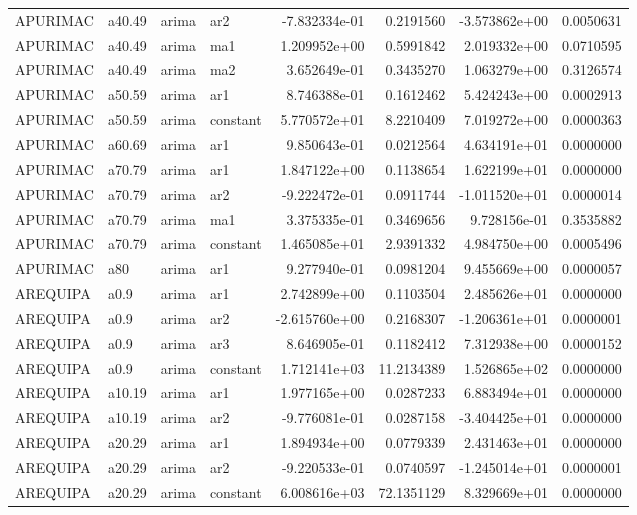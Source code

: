 \documentclass[
]{article}
\begin{document}
\begin{table}[!h]
\begin{tabular}[t]{llllrrrr}
APURIMAC & a40.49 & arima & ar2 & -7.832334e-01 & 0.2191560 & -3.573862e+00 & 0.0050631\\
APURIMAC & a40.49 & arima & ma1 & 1.209952e+00 & 0.5991842 & 2.019332e+00 & 0.0710595\\
\addlinespace
APURIMAC & a40.49 & arima & ma2 & 3.652649e-01 & 0.3435270 & 1.063279e+00 & 0.3126574\\
APURIMAC & a50.59 & arima & ar1 & 8.746388e-01 & 0.1612462 & 5.424243e+00 & 0.0002913\\
APURIMAC & a50.59 & arima & constant & 5.770572e+01 & 8.2210409 & 7.019272e+00 & 0.0000363\\
APURIMAC & a60.69 & arima & ar1 & 9.850643e-01 & 0.0212564 & 4.634191e+01 & 0.0000000\\
APURIMAC & a70.79 & arima & ar1 & 1.847122e+00 & 0.1138654 & 1.622199e+01 & 0.0000000\\
\addlinespace
APURIMAC & a70.79 & arima & ar2 & -9.222472e-01 & 0.0911744 & -1.011520e+01 & 0.0000014\\
APURIMAC & a70.79 & arima & ma1 & 3.375335e-01 & 0.3469656 & 9.728156e-01 & 0.3535882\\
APURIMAC & a70.79 & arima & constant & 1.465085e+01 & 2.9391332 & 4.984750e+00 & 0.0005496\\
APURIMAC & a80 & arima & ar1 & 9.277940e-01 & 0.0981204 & 9.455669e+00 & 0.0000057\\
AREQUIPA & a0.9 & arima & ar1 & 2.742899e+00 & 0.1103504 & 2.485626e+01 & 0.0000000\\
\addlinespace
AREQUIPA & a0.9 & arima & ar2 & -2.615760e+00 & 0.2168307 & -1.206361e+01 & 0.0000001\\
AREQUIPA & a0.9 & arima & ar3 & 8.646905e-01 & 0.1182412 & 7.312938e+00 & 0.0000152\\
AREQUIPA & a0.9 & arima & constant & 1.712141e+03 & 11.2134389 & 1.526865e+02 & 0.0000000\\
AREQUIPA & a10.19 & arima & ar1 & 1.977165e+00 & 0.0287233 & 6.883494e+01 & 0.0000000\\
AREQUIPA & a10.19 & arima & ar2 & -9.776081e-01 & 0.0287158 & -3.404425e+01 & 0.0000000\\
\addlinespace
AREQUIPA & a20.29 & arima & ar1 & 1.894934e+00 & 0.0779339 & 2.431463e+01 & 0.0000000\\
AREQUIPA & a20.29 & arima & ar2 & -9.220533e-01 & 0.0740597 & -1.245014e+01 & 0.0000001\\
AREQUIPA & a20.29 & arima & constant & 6.008616e+03 & 72.1351129 & 8.329669e+01 & 0.0000000\\

\end{tabular}
\end{table}
\end{document}
